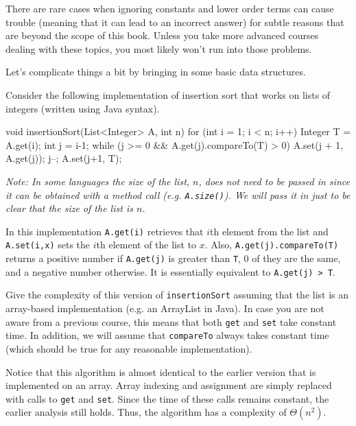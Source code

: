 \begin{rem}
There are rare cases when ignoring constants and lower order terms can cause 
trouble (meaning that it can lead to an incorrect answer) for subtle reasons
that are beyond the scope of this book. 
Unless you take more advanced courses dealing with these topics, 
you most likely won't run into those problems.
\end{rem}

Let's complicate things a bit by bringing in some basic data structures.

\begin{exa}
Consider the following implementation of insertion sort that works on lists of integers
(written using Java syntax).
\begin{code}
void insertionSort(List<Integer> A, int n) {
    for (int i = 1; i < n; i++) {
        Integer T = A.get(i);
        int j = i-1;
        while (j >= 0 && A.get(j).compareTo(T) > 0) {
            A.set(j + 1, A.get(j));
            j--;
        }
        A.set(j+1, T);
    }
}
\end{code}
{\em Note: In some languages the size of the list, $n$, does not need to be passed in
since it can be obtained with a method call (e.g. \verb+A.size()+). 
We will pass it in just to be clear that the size of the list is $n$.}

In this implementation \verb+A.get(i)+ retrieves that $i$th element from the list
and \verb+A.set(i,x)+ sets the $i$th element of the list to $x$.
Also, 
 \verb+A.get(j).compareTo(T)+ returns a positive number if \verb+A.get(j)+
 is greater than \verb+T+, 0 of they are the same, and a negative number otherwise.
 It is essentially equivalent to \verb+A.get(j) > T+.

Give the complexity of this version of \verb+insertionSort+ assuming that the list is an array-based
implementation (e.g. an ArrayList in Java).  In case you are not aware from a previous course,
this means that both \verb+get+ and \verb+set+ take constant time.
In addition, we will assume that \verb+compareTo+ always takes constant time
(which should be true for any reasonable implementation).

\begin{sol}
Notice that this algorithm is almost identical to the earlier version that is implemented
on an array.  Array indexing and assignment are simply replaced with calls to \verb+get+
and \verb+set+.  Since the time of these calls remains constant, the earlier analysis still
holds.  Thus, the algorithm has a complexity of $\Theta(n^2)$.
\end{sol}
\end{exa}

